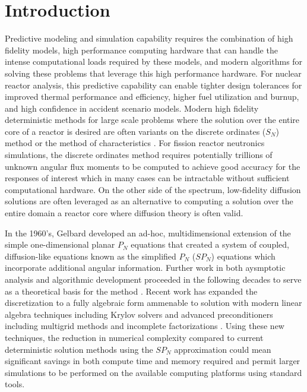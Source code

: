 \documentclass[letterpaper,11pt]{article}
\begin{document}
\section{Introduction}

Predictive modeling and simulation capability requires the combination
of high fidelity models, high performance computing hardware that can
handle the intense computational loads required by these models, and
modern algorithms for solving these problems that leverage this high
performance hardware. For nuclear reactor analysis, this predictive
capability can enable tighter design tolerances for improved thermal
performance and efficiency, higher fuel utilization and burnup, and
high confidence in accident scenario models. Modern high fidelity
deterministic methods for large scale problems where the solution over
the entire core of a reactor is desired are often variants on the
discrete ordinates ($S_N$) method \cite{evans_denovo:_2010} or the
method of characteristics \cite{askew_1972}. For fission reactor
neutronics simulations, the discrete ordinates method requires
potentially trillions of unknown angular flux moments to be computed
to achieve good accuracy for the responses of interest
\cite{slaybaugh_acceleration_2011} which in many cases can be
intractable without sufficient computational hardware. On the other
side of the spectrum, low-fidelity diffusion solutions are often
leveraged as an alternative to computing a solution over the entire
domain a reactor core where diffusion theory is often valid. 

In the 1960's, Gelbard developed an ad-hoc, multidimensional extension
of the simple one-dimensional planar $P_N$ equations that created a
system of coupled, diffusion-like equations known as the simplified
$P_N$ ($SP_N$) equations \cite{gelbard_1960} which incorporate
additional angular information. Further work in both aysmptotic
analysis and algorithmic development proceeded in the following
decades to serve as a theoretical basis for the method
\cite{morel_1996,brantley_simplified_2000}. Recent work has expanded
the discretization to a fully algebraic form ammenable to solution
with modern linear algebra techniques including Krylov solvers and
advanced preconditioners including multigrid methods and incomplete
factorizations \cite{hamilton_2014}. Using these new techniques, the
reduction in numerical complexity compared to current deterministic
solution methods using the $SP_N$ approximation could mean significant
savings in both compute time and memory required and permit larger
simulations to be performed on the available computing platforms using
standard tools.
\end{document}
